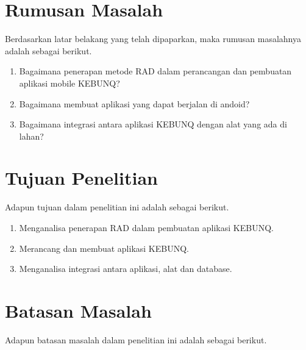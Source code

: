 \begin{flushleft}
\begin{justify}
\end{justify}
\vspace{1cm}   

\section{Rumusan Masalah}
\begin{justify}
  Berdasarkan latar belakang yang telah dipaparkan, maka rumusan masalahnya adalah sebagai berikut.
\end{justify}
\begin{enumerate}
  \item Bagaimana penerapan metode RAD dalam perancangan dan pembuatan aplikasi mobile KEBUNQ?
  \item Bagaimana membuat aplikasi yang dapat berjalan di andoid?
  \item Bagaimana integrasi antara aplikasi KEBUNQ dengan alat yang ada di lahan?
  
  
\end{enumerate}
\vspace{2cm}

\section{Tujuan Penelitian}

\begin{justify}
  Adapun tujuan dalam penelitian ini adalah sebagai berikut.


\end{justify}
\begin{enumerate}
  \item Menganalisa penerapan RAD dalam pembuatan aplikasi KEBUNQ.
  \item Merancang dan membuat aplikasi KEBUNQ.
  \item Menganalisa integrasi antara aplikasi, alat dan database.
  
  \end{enumerate}
\vspace{2cm}

\section{Batasan Masalah}

\begin{justify}
  Adapun batasan masalah dalam penelitian ini adalah sebagai berikut.



\end{justify}
\end{flushleft}
